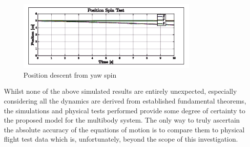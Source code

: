 \begin{figure}[htbp]
\centering
\vspace{-8pt}
\includegraphics[width=0.8\textwidth]{graphs/spin_position}
\vspace{-6pt}
\caption{Position descent from yaw spin}
\vspace{-10pt}
\label{fig:spin_position}
\end{figure}
\par
Whilst none of the above simulated results are entirely unexpected, especially considering all the dynamics are derived from established fundamental theorems, the simulations and physical tests performed provide some degree of certainty to the proposed model for the multibody system. The only way to truly ascertain the absolute accuracy of the equations of motion is to compare them to physical flight test data which is, unfortunately, beyond the scope of this investigation.
